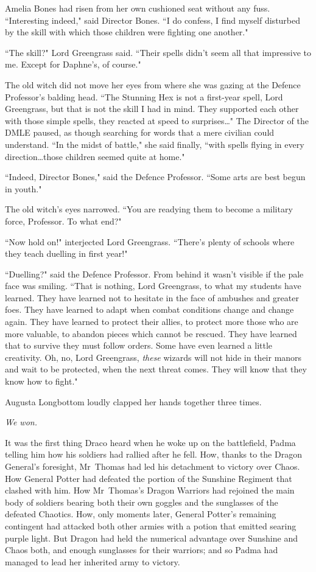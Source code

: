 Amelia Bones had risen from her own cushioned seat without any fuss. ``Interesting indeed," said Director Bones. ``I do confess, I find myself disturbed by the skill with which those children were fighting one another."

``The skill?" Lord Greengrass said. ``Their spells didn't seem all that impressive to me. Except for Daphne's, of course."

The old witch did not move her eyes from where she was gazing at the Defence Professor's balding head. ``The Stunning Hex is not a first-year spell, Lord Greengrass, but that is not the skill I had in mind. They supported each other with those simple spells, they reacted at speed to surprises…" The Director of the DMLE paused, as though searching for words that a mere civilian could understand. ``In the midst of battle," she said finally, ``with spells flying in every direction…those children seemed quite at home."

``Indeed, Director Bones," said the Defence Professor. ``Some arts are best begun in youth."

The old witch's eyes narrowed. ``You are readying them to become a military force, Professor. To what end?"

``Now hold on!" interjected Lord Greengrass. ``There's plenty of schools where they teach duelling in first year!"

``Duelling?" said the Defence Professor. From behind it wasn't visible if the pale face was smiling. ``That is nothing, Lord Greengrass, to what my students have learned. They have learned not to hesitate in the face of ambushes and greater foes. They have learned to adapt when combat conditions change and change again. They have learned to protect their allies, to protect more those who are more valuable, to abandon pieces which cannot be rescued. They have learned that to survive they must follow orders. Some have even learned a little creativity. Oh, no, Lord Greengrass, \emph{these} wizards will not hide in their manors and wait to be protected, when the next threat comes. They will know that they know how to fight."

Augusta Longbottom loudly clapped her hands together three times.

\later

\emph{We won.}

It was the first thing Draco heard when he woke up on the battlefield, Padma telling him how his soldiers had rallied after he fell. How, thanks to the Dragon General's foresight, Mr~Thomas had led his detachment to victory over Chaos. How General Potter had defeated the portion of the Sunshine Regiment that clashed with him. How Mr~Thomas's Dragon Warriors had rejoined the main body of soldiers bearing both their own goggles and the sunglasses of the defeated Chaotics. How, only moments later, General Potter's remaining contingent had attacked both other armies with a potion that emitted searing purple light. But Dragon had held the numerical advantage over Sunshine and Chaos both, and enough sunglasses for their warriors; and so Padma had managed to lead her inherited army to victory.

